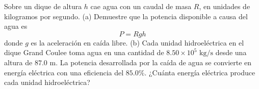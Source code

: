 \item Sobre un dique de altura $h$ cae agua con un caudal de masa $R$, en unidades de kilogramos por segundo. (a) Demuestre que la potencia disponible a causa del agua es
$$ P = R g h $$
donde $g$ es la aceleración en caída libre. (b) Cada unidad hidroeléctrica en el dique Grand Coulee toma agua en una cantidad de $8.50 \times 10^5 \text{ kg/s}$ desde una altura de $87.0 \text{ m}$. La potencia desarrollada por la caída de agua se convierte en energía eléctrica con una eficiencia del $85.0\%$. ¿Cuánta energía eléctrica produce cada unidad hidroeléctrica?
